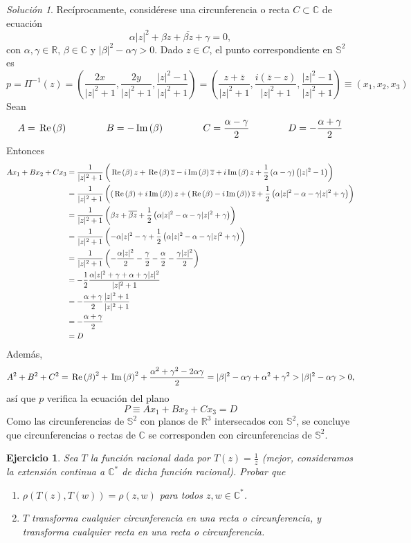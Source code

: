 \documentclass[11pt]{report}
\newcommand{\R}{\mathbb R}
\newcommand{\C}{\mathbb C}
\renewcommand{\S}{\mathbb S}
\newcommand{\pars}[1]{\left( #1 \right)} %
\renewcommand{\Re}[1]{\,\textup{Re}\pars{#1}}
\renewcommand{\Im}[1]{\,\textup{Im}\pars{#1}}
\newtheorem{exercise}{Ejercicio}
\theoremstyle{remark}
\newtheorem*{resolution}{Solución}
\begin{document}
\begin{resolution}
    Recíprocamente, considérese una circunferencia o recta $C \subset \C$ de ecuación
    \[\alpha |z|^2+\beta z +\overline{\beta z}+\gamma = 0,\]
    con $\alpha, \gamma \in \R$, $\beta \in \C$ y $|\beta|^2-\alpha\gamma >0$. Dado $z \in C$, el punto correspondiente en $\S^2$ es
    \[p = \Pi^{-1}(z) = \pars{\frac{2x}{|z|^2+1},\frac{2y}{|z|^2+1},\frac{|z|^2-1}{|z|^2+1}} = \pars{\frac{z+\overline{z}}{|z|^2+1},\frac{i(\overline{z}-z)}{|z|^2+1},\frac{|z|^2-1}{|z|^2+1}} \equiv (x_1,x_2,x_3)\]
    Sean
    \[A = \Re{\beta} \qquad \qquad B = -\Im{\beta} \qquad \qquad C = \frac{\alpha-\gamma}{2} \qquad \qquad D = -\frac{\alpha+\gamma}{2}\]
    Entonces
    \[\begin{aligned}[t]
        Ax_1+Bx_2+Cx_3 &= \frac{1}{|z|^2+1}\pars{\Re{\beta}z+\Re{\beta}\overline{z}-i\Im{\beta}\overline{z}+i\Im{\beta}z+\frac{1}{2}\pars{\alpha-\gamma}\pars{|z|^2-1}} \\
        &=\frac{1}{|z|^2+1}\pars{\pars{\Re{\beta}+i\Im{\beta}}z+\pars{\Re{\beta}-i\Im{\beta}}\overline{z}+\frac{1}{2}\pars{\alpha|z|^2-\alpha-\gamma |z|^2+\gamma}} \\
        &= \frac{1}{|z|^2+1}\pars{\beta z+\overline{\beta z}+\frac{1}{2}\pars{\alpha|z|^2-\alpha-\gamma |z|^2+\gamma}} \\
        &=\frac{1}{|z|^2+1}\pars{-\alpha |z|^2-\gamma+\frac{1}{2}\pars{\alpha|z|^2-\alpha-\gamma |z|^2+\gamma}} \\
        &=\frac{1}{|z|^2+1}\pars{-\frac{\alpha|z|^2}{2}-\frac{\gamma}{2}-\frac{\alpha}{2}-\frac{\gamma|z|^2}{2}} \\
        &=-\frac{1}{2}\frac{\alpha|z|^2+\gamma+\alpha+\gamma|z|^2}{|z|^2+1} \\
        &=-\frac{\alpha+\gamma}{2}\frac{|z|^2+1}{|z|^2+1} \\
        &=-\frac{\alpha+\gamma}{2} \\
        &= D
    \end{aligned}\]
    Además,
    \[A^2+B^2+C^2=\Re{\beta}^2+\Im{\beta}^2+\frac{\alpha^2+\gamma^2-2\alpha\gamma}{2} = |\beta|^2-\alpha\gamma+\alpha^2+\gamma^2 >|\beta|^2-\alpha\gamma>0,\]
    así que $p$ verifica la ecuación del plano
    \[P \equiv Ax_1+Bx_2+Cx_3 = D\]
    Como las circunferencias de $\S^2$ con planos de $\R^3$ intersecados con $\S^2$, se concluye que circunferencias o rectas de $\C$ se corresponden con circunferencias de $\S^2$.
\end{resolution}

\begin{exercise}
    Sea $T$ la función racional dada por $T(z) = \frac{1}{z}$ (mejor, consideramos la extensión continua a $\C^*$ de dicha función racional). Probar que
    \begin{enumerate}
        \item $\rho(T(z),T(w)) = \rho(z,w)$ para todos $z, w \in \C^*$.
        \item $T$ transforma cualquier circunferencia en una recta o circunferencia, y transforma cualquier recta en una recta o circunferencia.
    \end{enumerate}
\end{exercise}
\end{document}
